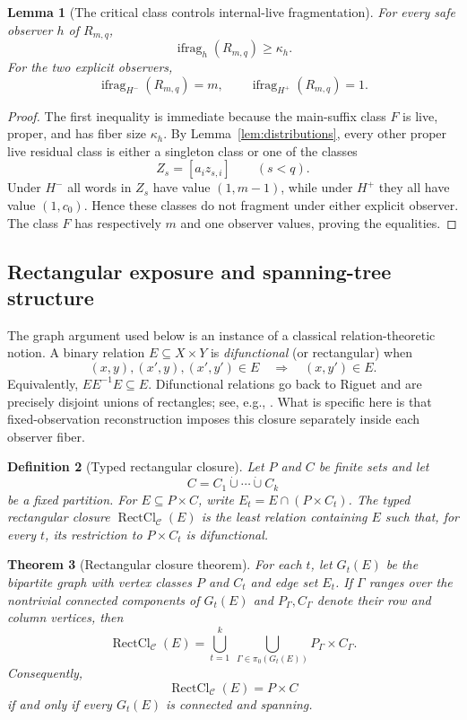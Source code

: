 \documentclass[11pt]{article}
\newtheorem{definition}{Definition}[section]
\newtheorem{lemma}[definition]{Lemma}
\newtheorem{theorem}[definition]{Theorem}
\newcommand{\ifrag}{\operatorname{ifrag}}
\newcommand{\RectCl}{\operatorname{RectCl}}
\begin{document}
\begin{lemma}[The critical class controls internal-live fragmentation]
\label{lem:ifrag-kappa}
For every safe observer $h$ of $R_{m,q}$,
\[
 \ifrag_h(R_{m,q})\ge\kappa_h.
\]
For the two explicit observers,
\[
 \ifrag_{H^-}(R_{m,q})=m,
 \qquad
 \ifrag_{H^+}(R_{m,q})=1.
\]
\end{lemma}

\begin{proof}
The first inequality is immediate because the main-suffix class $F$ is live,
proper, and has fiber size $\kappa_h$.  By
Lemma~\ref{lem:distributions}, every other proper live residual class is either
a singleton class or one of the classes
\[
 Z_s=[a_i z_{s,i}]\qquad(s<q).
\]
Under $H^-$ all words in $Z_s$ have value $(1,m-1)$, while under $H^+$ they
all have value $(1,c_0)$.  Hence these classes do not fragment under either
explicit observer.  The class $F$ has respectively $m$ and one observer
values, proving the equalities.
\end{proof}



\subsection{Rectangular exposure and spanning-tree structure}

The graph argument used below is an instance of a classical relation-theoretic
notion.  A binary relation $E\subseteq X\times Y$ is \emph{difunctional}
(or rectangular) when
\[
 (x,y),(x',y),(x',y')\in E
 \quad\Longrightarrow\quad
 (x,y')\in E.
\]
Equivalently, $EE^{-1}E\subseteq E$.  Difunctional relations go back to
Riguet and are precisely disjoint unions of rectangles; see, e.g.,
\cite{Riguet1950,BackhouseOliveira2023}.  What is specific here is that
fixed-observation reconstruction imposes this closure separately inside each
observer fiber.

\begin{definition}[Typed rectangular closure]
Let $P$ and $C$ be finite sets and let
\[
 C=C_1\dot\cup\cdots\dot\cup C_k
\]
be a fixed partition.  For $E\subseteq P\times C$, write
$E_t=E\cap(P\times C_t)$.  The \emph{typed rectangular closure}
$\RectCl_{\mathcal C}(E)$ is the least relation containing $E$ such that,
for every $t$, its restriction to $P\times C_t$ is difunctional.
\end{definition}

\begin{theorem}[Rectangular closure theorem]
\label{thm:rectangular-closure}
For each $t$, let $G_t(E)$ be the bipartite graph with vertex classes $P$ and
$C_t$ and edge set $E_t$.  If $\Gamma$ ranges over the nontrivial connected
components of $G_t(E)$ and $P_\Gamma,C_\Gamma$ denote their row and column
vertices, then
\[
 \boxed{
 \RectCl_{\mathcal C}(E)
 =
 \bigcup_{t=1}^k\ \bigcup_{\Gamma\in\pi_0(G_t(E))}
 P_\Gamma\times C_\Gamma .
 }
\]
Consequently,
\[
 \RectCl_{\mathcal C}(E)=P\times C
\]
if and only if every $G_t(E)$ is connected and spanning.
\end{theorem}
\end{document}
